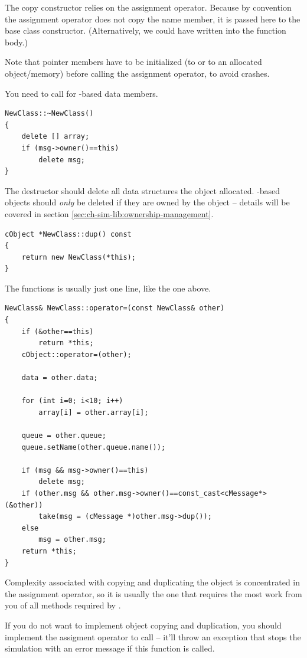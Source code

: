 The copy constructor relies on the assignment operator. Because
by convention the assignment operator does not copy the
name member, it is passed here to the base class constructor.
(Alternatively, we could have written 
into the function body.)

Note that pointer members have to be initialized (to  or to an
allocated object/memory) before calling the assignment operator,
to avoid crashes.

You need to call  for -based data members.

\begin{verbatim}
NewClass::~NewClass()
{
    delete [] array;
    if (msg->owner()==this)
        delete msg;
}
\end{verbatim}

The destructor should delete all data structures the object allocated.
-based objects should \textit{only} be deleted if they
are owned by the object -- details will be covered in section
\ref{sec:ch-sim-lib:ownership-management}.

\begin{verbatim}
cObject *NewClass::dup() const
{
    return new NewClass(*this);
}
\end{verbatim}

The  functions is usually just one line, like the one above.

\begin{verbatim}
NewClass& NewClass::operator=(const NewClass& other)
{
    if (&other==this)
        return *this;
    cObject::operator=(other);

    data = other.data;

    for (int i=0; i<10; i++)
        array[i] = other.array[i];

    queue = other.queue;
    queue.setName(other.queue.name());

    if (msg && msg->owner()==this)
        delete msg;
    if (other.msg && other.msg->owner()==const_cast<cMessage*>(&other))
        take(msg = (cMessage *)other.msg->dup());
    else
        msg = other.msg;
    return *this;
}
\end{verbatim}

Complexity associated with copying and duplicating the object
is concentrated in the assignment operator, so it is usually
the one that requires the most work from you of all methods
required by .

If you do not want to implement object copying and duplication,
you should implement the assigment operator to call
 -- it'll throw an exception that
stops the simulation with an error message if this function
is called.

